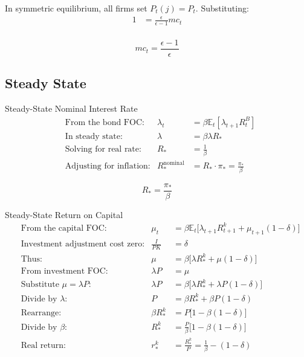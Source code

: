 \documentclass[11pt,preprint]{elsarticle}
\numberwithin{equation}{section}
\numberwithin{figure}{section}
\numberwithin{table}{section}
\begin{document}
In symmetric equilibrium, all firms set \(P_t(j) = P_t\).
Substituting:\\
\begin{align*}
1 &= \frac{\epsilon}{\epsilon - 1} mc_t \\
\end{align*}

\begin{equation}
\boxed{
mc_t = \frac{\epsilon - 1}{\epsilon}
}
\end{equation}

\subsection{\texorpdfstring{Steady State
\label{steady_state_app}}{Steady State }}\label{steady-state-1}

Steady-State Nominal Interest Rate \begin{align*}
&\text{From the bond FOC:} &\lambda_t &= \beta \mathbb{E}_t[\lambda_{t+1} R^B_t] \\
&\text{In steady state:} &\lambda &= \beta \lambda R_* \\
&\text{Solving for real rate:} &R_* &= \frac{1}{\beta} \\
&\text{Adjusting for inflation:} &R_*^{\text{nominal}} &= R_* \cdot \pi_* = \frac{\pi_*}{\beta}
\end{align*}

\begin{equation} \label{steady_interest_app}
\boxed{
R_* = \frac{\pi_*}{\beta}
}
\end{equation}

Steady-State Return on Capital \begin{align*}
&\text{From the capital FOC:} &\mu_t &= \beta \mathbb{E}_t\bigl[\lambda_{t+1} R^k_{t+1} + \mu_{t+1}(1-\delta)\bigr] \\
&\text{Investment adjustment cost zero:} &\frac{I}{P K} &= \delta \\
&\text{Thus:} &\mu &= \beta\bigl[\lambda R^k_* + \mu (1-\delta)\bigr] \\
&\text{From investment FOC:} &\lambda P &= \mu \\
&\text{Substitute }\mu=\lambda P: &\lambda P &= \beta\bigl[\lambda R^k_* + \lambda P(1-\delta)\bigr] \\
&\text{Divide by }\lambda: &P &= \beta R^k_* + \beta P(1-\delta) \\
&\text{Rearrange:} &\beta R^k_* &= P\bigl[1 - \beta(1-\delta)\bigr] \\
&\text{Divide by }\beta: &R^k_* &= \frac{P}{\beta}\bigl[1 - \beta(1-\delta)\bigr] \\
&\text{Real return:} &r^k_* &= \frac{R^k_*}{P} = \frac{1}{\beta} - (1-\delta)
\end{align*}
\end{document}
